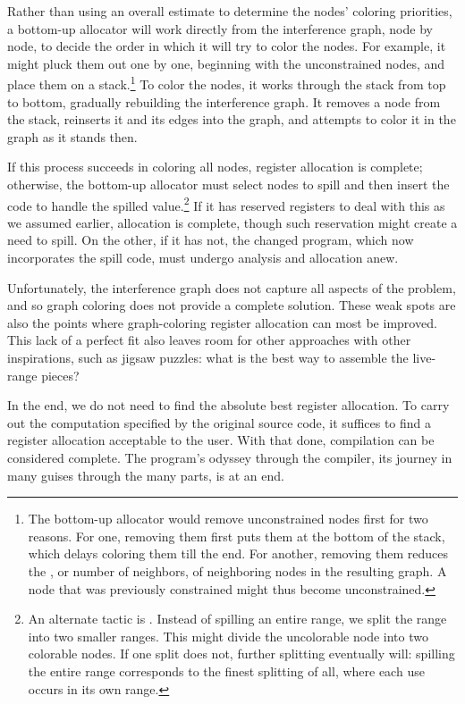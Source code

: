 Rather than using an overall estimate to determine the nodes' coloring priorities, a bottom-up allocator will work directly from the interference graph, node by node, to decide the order in which it will try to color the nodes. For example, it might pluck them out one by one, beginning with the unconstrained nodes, and place them on a stack.\footnote{The bottom-up allocator would remove unconstrained nodes first for two reasons. For one, removing them first puts them at the bottom of the stack, which delays coloring them till the end. For another, removing them reduces the , or number of neighbors, of neighboring nodes in the resulting graph. A node that was previously constrained might thus become unconstrained.} To color the nodes, it works through the stack from top to bottom, gradually rebuilding the interference graph. It removes a node from the stack, reinserts it and its edges into the graph, and attempts to color it in the graph as it stands then.

If this process succeeds in coloring all nodes, register allocation is complete; otherwise, the bottom-up allocator must select nodes to spill and then insert the code to handle the spilled value.\footnote{An alternate tactic is . Instead of spilling an entire range, we split the range into two smaller ranges. This might divide the uncolorable node into two colorable nodes. If one split does not, further splitting eventually will: spilling the entire range corresponds to the finest splitting of all, where each use occurs in its own range.} If it has reserved registers to deal with this as we assumed earlier, allocation is complete, though such reservation might create a need to spill. On the other, if it has not, the changed program, which now incorporates the spill code, must undergo analysis and allocation anew.

Unfortunately, the interference graph does not capture all aspects of the problem, and so graph coloring does not provide a complete solution. These weak spots are also the points where graph-coloring register allocation can most be improved. This lack of a perfect fit also leaves room for other approaches with other inspirations, such as jigsaw puzzles: what is the best way to assemble the live-range pieces?

In the end, we do not need to find the absolute best register allocation. To carry out the computation specified by the original source code, it suffices to find a register allocation acceptable to the user. With that done, compilation can be considered complete. The program's odyssey through the compiler, its journey in many guises through the many parts, is at an end.